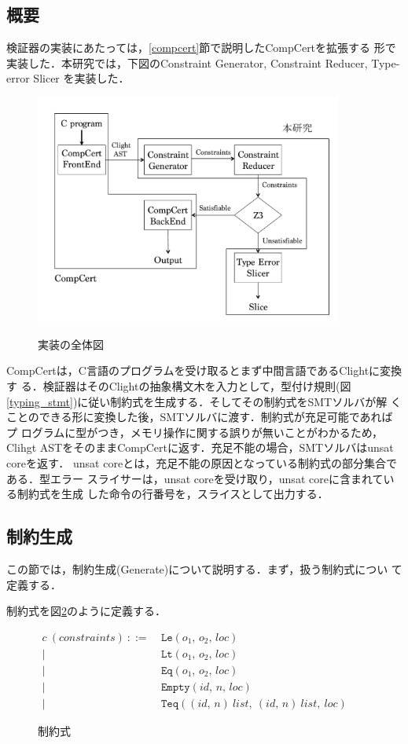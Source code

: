 \subsection{概要}
検証器の実装にあたっては，\ref{compcert}節で説明したCompCertを拡張する
形で実装した．本研究では，下図のConstraint Generator, Constraint
Reducer, Type-error Slicer を実装した．

\begin{figure}[H]
  \centering
  \includegraphics[width=0.9\textwidth]{verifier.pdf}
  \label{impl}
  \caption{実装の全体図}
\end{figure}

CompCertは，C言語のプログラムを受け取るとまず中間言語であるClightに変換す
る．検証器はそのClightの抽象構文木を入力として，型付け規則(図
\ref{typing_stmt})に従い制約式を生成する．そしてその制約式をSMTソルバが解
くことのできる形に変換した後，SMTソルバに渡す．制約式が充足可能であればプ
ログラムに型がつき，メモリ操作に関する誤りが無いことがわかるため，Clihgt
ASTをそのままCompCertに返す．充足不能の場合，SMTソルバはunsat coreを返す．
unsat coreとは，充足不能の原因となっている制約式の部分集合である．型エラー
スライサーは，unsat coreを受け取り，unsat coreに含まれている制約式を生成
した命令の行番号を，スライスとして出力する．


\subsection{制約生成}
この節では，制約生成(Generate)について説明する．まず，扱う制約式につい
て定義する．

\begin{definition}[制約式]
  制約式を図\ref{constr}のように定義する．
\end{definition}
\begin{figure}[htbp]
  \centering
  $
  \begin{aligned}
    c\ (constraints)\ ::=
    \ & \mathtt{Le} (o_{1},\,o_{2},\,loc)\ \\
    |\ &\mathtt{Lt}(o_{1},\,o_{2},\,loc)\ \\
    |\ &\mathtt{Eq}(o_{1},\,o_{2},\,loc)\ \\
    |\ &\mathtt{Empty}(id,\,n,\,loc)\ \\
    |\ &\mathtt{Teq}((id,\,n)\ list,\ (id,\,n)\ list,\ loc)
  \end{aligned}
  $
  \caption{制約式}
  \label{constr}
\end{figure}

